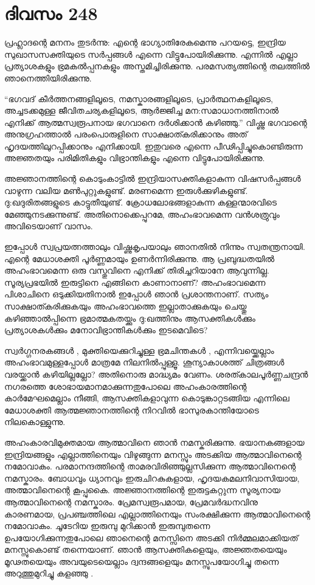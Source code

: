 \section{ദിവസം 248}


പ്രഹ്ലാദന്റെ മനനം തുടര്‍ന്നു: എന്റെ ഭാഗ്യാതിരേകമെന്നു പറയട്ടെ, ഇന്ദ്രിയ സുഖാസസക്തിയുടെ സര്‍പ്പങ്ങള്‍ എന്നെ വിട്ടുപോയിരിക്കുന്നു. എന്നില്‍ എല്ലാ പ്രത്യാശകളും ഭ്രമകല്‍പ്പനകളും അസ്തമിച്ചിരിക്കുന്നു. പരമസത്യത്തിന്റെ തലത്തില്‍ ഞാനെത്തിയിരിക്കുന്നു.

“ഭഗവദ് കീര്‍ത്തനങ്ങളിലൂടെ, നമസ്കാരങ്ങളിലൂടെ, പ്രാര്‍ത്ഥനകളിലൂടെ, അച്ചടക്കമുള്ള ജീവിതചര്യകളിലൂടെ, ആര്‍ജ്ജിച്ച മന:സമാധാനത്തിനാല്‍ എനിക്ക് ആത്മസ്വരൂപനായ ഭഗവാനെ ദര്‍ശിക്കാന്‍ കഴിഞ്ഞു.”  വിഷ്ണു ഭഗവാന്റെ അനുഗ്രഹത്താല്‍ പരംപൊരുളിനെ സാക്ഷാത്കരിക്കാനും അത് ഹൃദയത്തിലുറപ്പിക്കാനും എനിക്കായി. ഇതുവരെ എന്നെ പീഢിപ്പിച്ചുകൊണ്ടിരുന്ന അജ്ഞതയും പരിമിതികളും വിഭ്രാന്തികളും എന്നെ വിട്ടുപോയിരിക്കുന്നു.

അജ്ഞാനത്തിന്റെ കൊടുംകാട്ടില്‍ ഇന്ദ്രിയാസക്തികളാകുന്ന വിഷസര്‍പ്പങ്ങള്‍ വാഴുന്ന വലിയ മണ്‍പുറ്റുകളുണ്ട്. മരണമെന്ന ഇരുള്‍ക്കുഴികളുണ്ട്. ദു:ഖദുരിതങ്ങളുടെ കാട്ടുതീയുണ്ട്. ക്രോധലോഭങ്ങളാകുന്ന കള്ളന്മാരവിടെ മേഞ്ഞുനടക്കുന്നുണ്ട്. അതിനൊക്കെപ്പുറമേ, അഹംഭാവമെന്ന വന്‍ശത്രുവും അവിടെയാണ് വാസം.

ഇപ്പോള്‍ സ്വപ്രയത്നത്താലും വിഷ്ണുകൃപയാലും ഞാനതില്‍ നിന്നും സ്വതന്ത്രനായി. എന്റെ മേധാശക്തി പൂര്‍ണ്ണമായും ഉണര്‍ന്നിരിക്കുന്നു. ആ പ്രബുദ്ധതയില്‍ അഹംഭാവമെന്ന ഒരു വസ്തുവിനെ എനിക്ക് തിരിച്ചറിയാനേ ആവുന്നില്ല. സൂര്യപ്രഭയില്‍ ഇരുട്ടിനെ എങ്ങിനെ കാണാനാണ്? അഹംഭാവമെന്ന പിശാചിനെ ഒടുക്കിയതിനാല്‍ ഇപ്പോള്‍ ഞാന്‍ പ്രശാന്തനാണ്. സത്യം സാക്ഷാത്കരിക്കുകയും അഹംഭാവത്തെ ഇല്ലാതാക്കുകയും ചെയ്തു കഴിഞ്ഞാല്‍പ്പിന്നെ ഭ്രമാത്മകതയ്ക്കും ദു:ഖത്തിനും ആസക്തികള്‍ക്കും പ്രത്യാശകള്‍ക്കും മനോവിഭ്രാന്തികള്‍ക്കും ഇടമെവിടെ?  

സ്വര്‍ഗ്ഗനരകങ്ങള്‍ , മുക്തിയെക്കുറിച്ചുള്ള ഭ്രമചിന്തകള്‍ , എന്നിവയ്ക്കെല്ലാം അഹംഭാവമുള്ളപ്പോള്‍ മാത്രമേ നിലനില്‍പ്പുള്ളൂ. ശൂന്യാകാശത്ത് ചിത്രങ്ങള്‍ വരയ്ക്കാന്‍ കഴിയില്ലല്ലോ? അതിനൊരു മാദ്ധ്യമം വേണം. ശരത്കാലപൂര്‍ണ്ണചന്ദ്രന്‍ നഗരത്തെ ശോഭായമാനമാക്കുന്നതുപോലെ അഹംകാരത്തിന്റെ കാര്‍മേഘമെല്ലാം നീങ്ങി, ആസക്തികളാവുന്ന കൊടുങ്കാറ്റടങ്ങിയ എന്നിലെ മേധാശക്തി ആത്മജ്ഞാനത്തിന്റെ നിറവില്‍ ഭാസുരകാന്തിയോടെ നിലകൊള്ളുന്നു.

അഹംകാരവിമുക്തമായ ആത്മാവിനെ ഞാന്‍ നമസ്കരിക്കുന്നു. ഭയാനകങ്ങളായ ഇന്ദ്രിയങ്ങളും എല്ലാത്തിനെയും വിഴുങ്ങുന്ന മനസ്സും അടക്കിയ ആത്മാവിനെന്റെ നമോവാകം. പരമാനന്ദത്തിന്റെ താമരവിരിഞ്ഞുല്ലസിക്കുന്ന ആത്മാവിനെന്റെ നമസ്കാരം. ബോധവും ധ്യാനവും ഇരുചിറകുകളായ, ഹൃദയകമലനിവാസിയായ, അത്മാവിനെന്റെ കൂപ്പുകൈ. അജ്ഞാനത്തിന്റെ ഇരുട്ടകറ്റുന്ന സൂര്യനായ ആത്മാവിനെന്റെ നമസ്കാരം.  പ്രേമസ്വരൂപമായ, പ്രേമവര്‍ദ്ധനവിനു കാരണമായ, പ്രപഞ്ചത്തിലെ എല്ലാത്തിനെയും സംരക്ഷിക്കുന്ന ആത്മാവിനെന്റെ നമോവാകം.
ചൂടേറിയ ഇരുമ്പു മുറിക്കാന്‍ ഇരുമ്പുതന്നെ ഉപയോഗിക്കുന്നതുപോലെ ഞാനെന്റെ മനസ്സിനെ അടക്കി നിര്‍മ്മലമാക്കിയത് മനസ്സുകൊണ്ട് തന്നെയാണ്. ഞാന്‍ ആസക്തികളെയും, അജ്ഞതയെയും മൂഢതയെയും അവയുടെയെല്ലാം ദ്വന്ദങ്ങളെയും മനസ്സുപയോഗിച്ചു തന്നെ  അറുത്തുമുറിച്ചു കളഞ്ഞു .

